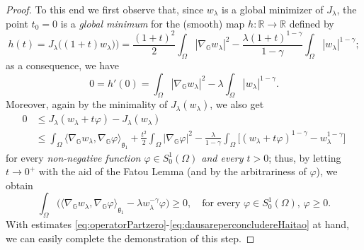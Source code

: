 \documentclass[11pt]{amsart}
\numberwithin{equation}{section} %
\theoremstyle{definition}
\begin{document}
\begin{proof}
			 To this end we first observe that, since $w_\lambda$ is a global minimizer of $J_\lambda$, the point $t_0 = 0$ is a 
			 \emph{global minimum} for the (smooth) map $h:\mathbb{R}\to\mathbb{R}$ defined by
			 $$h(t) = J_\lambda\big((1+t)w_\lambda)\big)
			 = \frac{(1+t)^2}{2}\int_\Omega|\nabla_\mathbb{G}w_\lambda|^2-
			 \frac{\lambda(1+t)^{1-\gamma}}{1-\gamma}\int_\Omega|w_\lambda|^{1-\gamma};$$
			 as a consequence, we have
			 \begin{equation} \label{eq:operatorPartzero}
			 	0 = h'(0) = \int_\Omega|\nabla_\mathbb{G}w_\lambda|^2-
			 \lambda\int_\Omega|w_\lambda|^{1-\gamma}. 
			 \end{equation}
			 Moreover, again by the minimality of $J_\lambda(w_\lambda)$, we also get
			 \begin{align*}
			 	0&\leq J_\lambda(w_\lambda+t\varphi)
			 	-J_\lambda(w_\lambda) \\
			 	& \leq \int_\Omega\langle\nabla_\mathbb{G}w_\lambda,\nabla_\mathbb{G}\varphi\rangle_{\mathfrak{g}_{1}}
			 + \frac{t^2}{2}\int_\Omega |\nabla_\mathbb{G}\varphi|^2
			  - \frac{\lambda}{1-\gamma}\int_\Omega\big[
			 (w_\lambda+t\varphi)^{1-\gamma}-w_\lambda^{1-\gamma}\big]
			 \end{align*}
			 for every \emph{non-negative function $\varphi\in S_0^1(\Omega)$ and every $t > 0$};
			 thus, by letting $t\to 0^+$ with the aid of the Fatou Lemma
			 (and by the arbitrariness of $\varphi$),
			 we obtain 
			 \begin{equation} \label{eq:dausareperconcludereHaitao}
			 \int_\Omega\big(\langle\nabla_\mathbb{G}w_\lambda,\nabla_\mathbb{G}\varphi\rangle_{\mathfrak{g}_{1}}
			 - {\lambda} w_\lambda^{-\gamma}\varphi\big)\geq 0,\quad\text{for every
			 $\varphi\in S_0^1(\Omega),\,\varphi\geq 0$}.
			 \end{equation}
			 With estimates \eqref{eq:operatorPartzero}-\eqref{eq:dausareperconcludereHaitao} at hand,
			 we can easily complete the demonstration of this step. 
			 

\end{proof}
\end{document}
